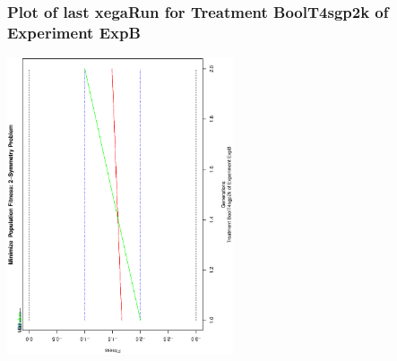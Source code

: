  \begin{frame}
 \frametitle{ Plot of last xegaRun for Treatment BoolT4sgp2k of Experiment ExpB }
 \begin{center}
\includegraphics[width=0.5\textwidth, angle=-90]
{ExpBPlotPopStatsFigure020.eps}
 \end{center}
 \label{report/ExpBPlotPopStatsFigure020.eps}  
 \end{frame}

